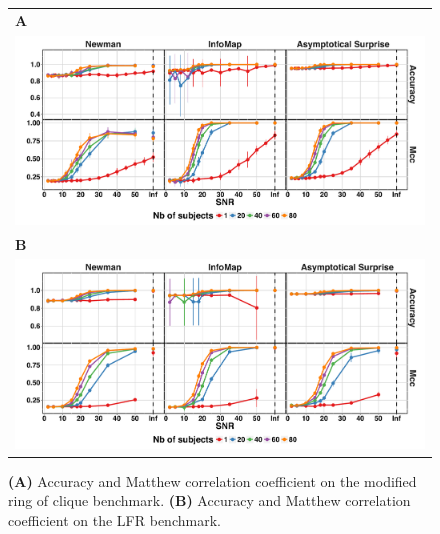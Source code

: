 \begin{figure}[!htb]
\centering
    \begin{tabular}{l}
    \textbf{\textsf{A}}  \\
    \includegraphics[width=1\textwidth]{images/figure3_supplementary.pdf} \\
    \textbf{\textsf{B}}  \\
    \includegraphics[width=1\textwidth]{images/figure4_supplementary.pdf}
    \end{tabular}
    \caption{\textbf{(A)} Accuracy and Matthew correlation coefficient on the modified ring of clique benchmark. \textbf{(B)} Accuracy and Matthew correlation coefficient on the LFR benchmark.}
    \label{fig:accmcc}
\end{figure}


